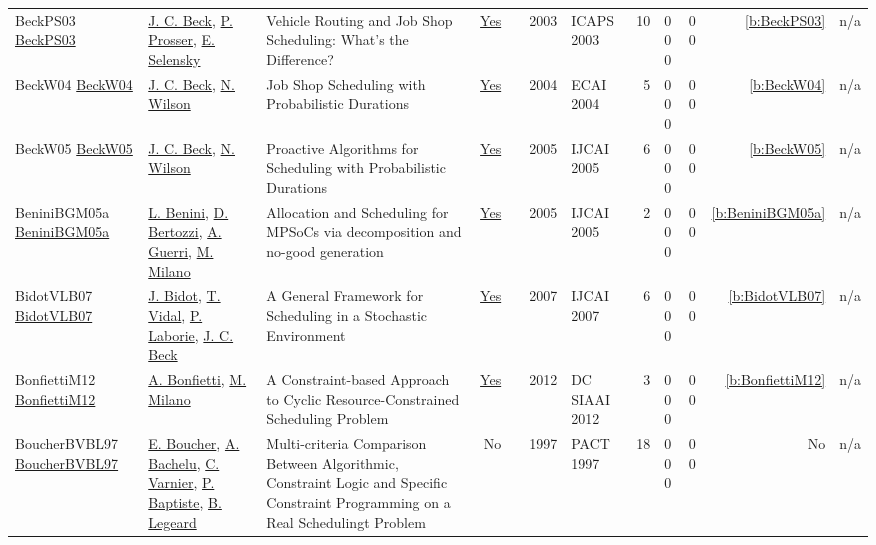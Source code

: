 {\begin{longtable}{>{\raggedright\arraybackslash}p{3cm}>{\raggedright\arraybackslash}p{4.5cm}>{\raggedright\arraybackslash}p{6.0cm}rrrp{2.5cm}rp{1cm}p{1cm}rr}
BeckPS03 \href{http://www.aaai.org/Library/ICAPS/2003/icaps03-027.php}{BeckPS03} & \hyperref[auth:a89]{J. C. Beck}, \hyperref[auth:a827]{P. Prosser}, \hyperref[auth:a828]{E. Selensky} & Vehicle Routing and Job Shop Scheduling: What's the Difference? & \href{../works/BeckPS03.pdf}{Yes} & \cite{BeckPS03} & 2003 & ICAPS 2003 & 10 & 0 0 0 & 0 0 & \ref{b:BeckPS03} & n/a\\
BeckW04 \href{}{BeckW04} & \hyperref[auth:a89]{J. C. Beck}, \hyperref[auth:a826]{N. Wilson} & Job Shop Scheduling with Probabilistic Durations & \href{../works/BeckW04.pdf}{Yes} & \cite{BeckW04} & 2004 & ECAI 2004 & 5 & 0 0 0 & 0 0 & \ref{b:BeckW04} & n/a\\
BeckW05 \href{http://ijcai.org/Proceedings/05/Papers/0748.pdf}{BeckW05} & \hyperref[auth:a89]{J. C. Beck}, \hyperref[auth:a826]{N. Wilson} & Proactive Algorithms for Scheduling with Probabilistic Durations & \href{../works/BeckW05.pdf}{Yes} & \cite{BeckW05} & 2005 & IJCAI 2005 & 6 & 0 0 0 & 0 0 & \ref{b:BeckW05} & n/a\\
BeniniBGM05a \href{http://ijcai.org/Proceedings/05/Papers/post-0368.pdf}{BeniniBGM05a} & \hyperref[auth:a245]{L. Benini}, \hyperref[auth:a375]{D. Bertozzi}, \hyperref[auth:a376]{A. Guerri}, \hyperref[auth:a143]{M. Milano} & Allocation and Scheduling for MPSoCs via decomposition and no-good generation & \href{../works/BeniniBGM05a.pdf}{Yes} & \cite{BeniniBGM05a} & 2005 & IJCAI 2005 & 2 & 0 0 0 & 0 0 & \ref{b:BeniniBGM05a} & n/a\\
BidotVLB07 \href{http://ijcai.org/Proceedings/07/Papers/007.pdf}{BidotVLB07} & \hyperref[auth:a824]{J. Bidot}, \hyperref[auth:a825]{T. Vidal}, \hyperref[auth:a118]{P. Laborie}, \hyperref[auth:a89]{J. C. Beck} & A General Framework for Scheduling in a Stochastic Environment & \href{../works/BidotVLB07.pdf}{Yes} & \cite{BidotVLB07} & 2007 & IJCAI 2007 & 6 & 0 0 0 & 0 0 & \ref{b:BidotVLB07} & n/a\\
BonfiettiM12 \href{https://ceur-ws.org/Vol-926/paper2.pdf}{BonfiettiM12} & \hyperref[auth:a198]{A. Bonfietti}, \hyperref[auth:a143]{M. Milano} & A Constraint-based Approach to Cyclic Resource-Constrained Scheduling Problem & \href{../works/BonfiettiM12.pdf}{Yes} & \cite{BonfiettiM12} & 2012 & DC SIAAI 2012 & 3 & 0 0 0 & 0 0 & \ref{b:BonfiettiM12} & n/a\\
BoucherBVBL97 \href{}{BoucherBVBL97} & \hyperref[auth:a690]{E. Boucher}, \hyperref[auth:a691]{A. Bachelu}, \hyperref[auth:a692]{C. Varnier}, \hyperref[auth:a693]{P. Baptiste}, \hyperref[auth:a694]{B. Legeard} & Multi-criteria Comparison Between Algorithmic, Constraint Logic and Specific Constraint Programming on a Real Schedulingt Problem & No & \cite{BoucherBVBL97} & 1997 & PACT 1997 & 18 & 0 0 0 & 0 0 & No & n/a\\

\end{longtable}}
